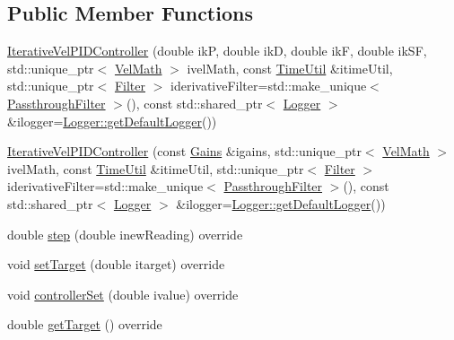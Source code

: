 \subsection*{Public Member Functions}
\begin{DoxyCompactItemize}
\item 
\mbox{\hyperlink{classokapi_1_1IterativeVelPIDController_a99d21352f8acdbc54e47d77c193cb641}{Iterative\+Vel\+P\+I\+D\+Controller}} (double ikP, double ikD, double ikF, double ik\+SF, std\+::unique\+\_\+ptr$<$ \mbox{\hyperlink{classokapi_1_1VelMath}{Vel\+Math}} $>$ ivel\+Math, const \mbox{\hyperlink{classokapi_1_1TimeUtil}{Time\+Util}} \&itime\+Util, std\+::unique\+\_\+ptr$<$ \mbox{\hyperlink{classokapi_1_1Filter}{Filter}} $>$ iderivative\+Filter=std\+::make\+\_\+unique$<$ \mbox{\hyperlink{classokapi_1_1PassthroughFilter}{Passthrough\+Filter}} $>$(), const std\+::shared\+\_\+ptr$<$ \mbox{\hyperlink{classokapi_1_1Logger}{Logger}} $>$ \&ilogger=\mbox{\hyperlink{classokapi_1_1Logger_a5053cf778b4b55acba788a3797dc96d2}{Logger\+::get\+Default\+Logger}}())
\item 
\mbox{\hyperlink{classokapi_1_1IterativeVelPIDController_a12d312cf6551c7a4559ad82e92487867}{Iterative\+Vel\+P\+I\+D\+Controller}} (const \mbox{\hyperlink{structokapi_1_1IterativeVelPIDController_1_1Gains}{Gains}} \&igains, std\+::unique\+\_\+ptr$<$ \mbox{\hyperlink{classokapi_1_1VelMath}{Vel\+Math}} $>$ ivel\+Math, const \mbox{\hyperlink{classokapi_1_1TimeUtil}{Time\+Util}} \&itime\+Util, std\+::unique\+\_\+ptr$<$ \mbox{\hyperlink{classokapi_1_1Filter}{Filter}} $>$ iderivative\+Filter=std\+::make\+\_\+unique$<$ \mbox{\hyperlink{classokapi_1_1PassthroughFilter}{Passthrough\+Filter}} $>$(), const std\+::shared\+\_\+ptr$<$ \mbox{\hyperlink{classokapi_1_1Logger}{Logger}} $>$ \&ilogger=\mbox{\hyperlink{classokapi_1_1Logger_a5053cf778b4b55acba788a3797dc96d2}{Logger\+::get\+Default\+Logger}}())
\item 
double \mbox{\hyperlink{classokapi_1_1IterativeVelPIDController_a7d75bb1622974daba25a9dec4df68325}{step}} (double inew\+Reading) override
\item 
void \mbox{\hyperlink{classokapi_1_1IterativeVelPIDController_ab4ec4344fa758ba8cce93633aa0851d2}{set\+Target}} (double itarget) override
\item 
void \mbox{\hyperlink{classokapi_1_1IterativeVelPIDController_a50c069752036261395871fbe175ae101}{controller\+Set}} (double ivalue) override
\item 
double \mbox{\hyperlink{classokapi_1_1IterativeVelPIDController_a5f2bbad6e916345f8a3abf762609321c}{get\+Target}} () override

\end{DoxyCompactItemize}
